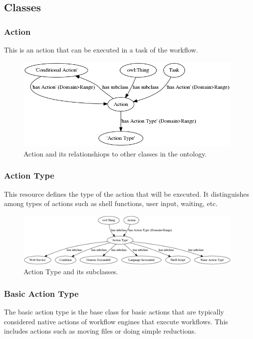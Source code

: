 \subsection{Classes}
			
\subsubsection{Action}
This is an action that can be executed in a task of the workflow.
			
\begin{figure}[htbp] \centering
\includegraphics[width=\textwidth]{figures/action.png}
\caption{Action and its relationshiops to other classes in the ontology.}
\label{action}
\end{figure}

\subsubsection{Action Type}
This resource defines the type of the action that will be executed. It
distinguishes among types of actions such as shell functions, user input,
waiting, etc.
			
\begin{figure}[htbp] \centering
\includegraphics[width=\textwidth]{figures/actionType.png}
\caption{Action Type and its subclasses.}
\label{actionType}
\end{figure}
			
\subsubsection{ Basic Action Type } The basic action type is the base class for
basic actions that are typically considered native actions of workflow engines
that execute workflows. This includes actions such as moving files or doing
simple reductions.
